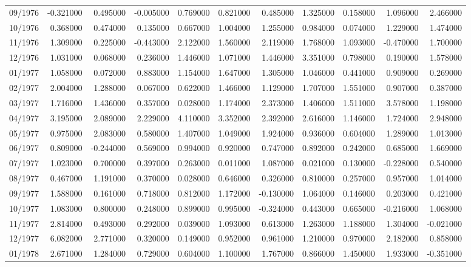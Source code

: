 \begin{tabular}{lrrrrrrrrrr}
09/1976 & -0.321000 & 0.495000 & -0.005000 & 0.769000 & 0.821000 & 0.485000 & 1.325000 & 0.158000 & 1.096000 & 2.466000 \\
10/1976 & 0.368000 & 0.474000 & 0.135000 & 0.667000 & 1.004000 & 1.255000 & 0.984000 & 0.074000 & 1.229000 & 1.474000 \\
11/1976 & 1.309000 & 0.225000 & -0.443000 & 2.122000 & 1.560000 & 2.119000 & 1.768000 & 1.093000 & -0.470000 & 1.700000 \\
12/1976 & 1.031000 & 0.068000 & 0.236000 & 1.446000 & 1.071000 & 1.446000 & 3.351000 & 0.798000 & 0.190000 & 1.578000 \\
01/1977 & 1.058000 & 0.072000 & 0.883000 & 1.154000 & 1.647000 & 1.305000 & 1.046000 & 0.441000 & 0.909000 & 0.269000 \\
02/1977 & 2.004000 & 1.288000 & 0.067000 & 0.622000 & 1.466000 & 1.129000 & 1.707000 & 1.551000 & 0.907000 & 0.387000 \\
03/1977 & 1.716000 & 1.436000 & 0.357000 & 0.028000 & 1.174000 & 2.373000 & 1.406000 & 1.511000 & 3.578000 & 1.198000 \\
04/1977 & 3.195000 & 2.089000 & 2.229000 & 4.110000 & 3.352000 & 2.392000 & 2.616000 & 1.146000 & 1.724000 & 2.948000 \\
05/1977 & 0.975000 & 2.083000 & 0.580000 & 1.407000 & 1.049000 & 1.924000 & 0.936000 & 0.604000 & 1.289000 & 1.013000 \\
06/1977 & 0.809000 & -0.244000 & 0.569000 & 0.994000 & 0.920000 & 0.747000 & 0.892000 & 0.242000 & 0.685000 & 1.669000 \\
07/1977 & 1.023000 & 0.700000 & 0.397000 & 0.263000 & 0.011000 & 1.087000 & 0.021000 & 0.130000 & -0.228000 & 0.540000 \\
08/1977 & 0.467000 & 1.191000 & 0.370000 & 0.028000 & 0.646000 & 0.326000 & 0.810000 & 0.257000 & 0.957000 & 1.014000 \\
09/1977 & 1.588000 & 0.161000 & 0.718000 & 0.812000 & 1.172000 & -0.130000 & 1.064000 & 0.146000 & 0.203000 & 0.421000 \\
10/1977 & 1.083000 & 0.800000 & 0.248000 & 0.899000 & 0.995000 & -0.324000 & 0.443000 & 0.665000 & -0.216000 & 1.068000 \\
11/1977 & 2.814000 & 0.493000 & 0.292000 & 0.039000 & 1.093000 & 0.613000 & 1.263000 & 1.188000 & 1.304000 & -0.021000 \\
12/1977 & 6.082000 & 2.771000 & 0.320000 & 0.149000 & 0.952000 & 0.961000 & 1.210000 & 0.970000 & 2.182000 & 0.858000 \\
01/1978 & 2.671000 & 1.284000 & 0.729000 & 0.604000 & 1.100000 & 1.767000 & 0.866000 & 1.450000 & 1.933000 & -0.351000 \\

\end{tabular}
